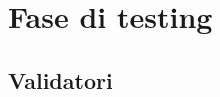 \section{Fase di testing}
\label{sec:fase_di_testing}
\subsection{Validatori}
\label{sub:validatori}

